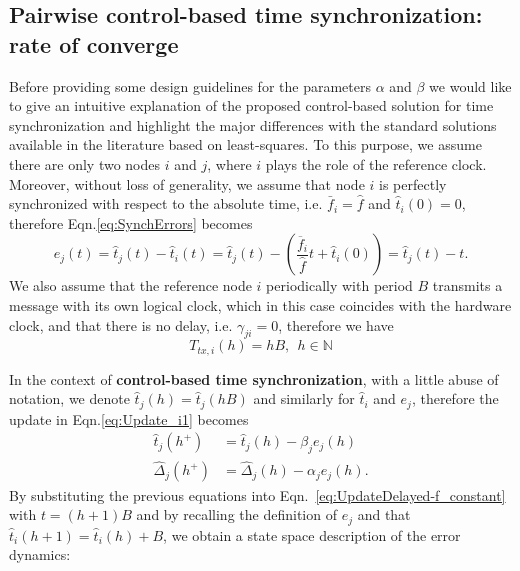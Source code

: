 \documentclass[english,a4paper,10pt,final]{article}
\numberwithin{equation}{section}
\numberwithin{figure}{section}
\begin{document}
\subsection{Pairwise control-based time synchronization: rate of converge}
\label{subsec:pairwise_control}

Before providing some design guidelines for the parameters $\alpha$ and $\beta$ we would like to give an intuitive explanation of the proposed control-based solution for time synchronization and highlight the major differences with the standard solutions available in the literature based on least-squares. To this purpose, we assume there are only two nodes $i$ and $j$, where $i$ plays the role of the reference clock. Moreover, without loss of generality, we assume that node $i$ is perfectly synchronized with respect to the absolute time, i.e. $\bar f_i=\hat f$ and $\hat t_i(0)=0$, therefore Eqn.\eqref{eq:SynchErrors} becomes
$$ e_j(t)=\hat{t}_j(t)-\hat{t}_i(t)=\hat{t}_j(t)-\left(\frac{\overline{f}_i}{\hat f}t+\hat{t}_i(0)\right)=\hat{t}_j(t)-t.$$
We also assume that the reference node $i$ periodically with period $B$ transmits a message with its own logical clock, which in this case coincides with the hardware clock, and that there is no delay, i.e. $\gamma_{ji}=0$, therefore we have
$$ T_{tx,i}(h)=hB, \ \ h\in \mathbb{N}$$


In the context of \textbf{control-based time synchronization}, with a little abuse of notation, we denote $\hat t_j(h)=\hat t_j(hB)$ and similarly for $\hat t_i$ and $e_j$, therefore the update in Eqn.\eqref{eq:Update_i1} becomes
\begin{align}
  \label{eq:up_simp}
\hat{t}_j(h^+) &=\hat{t}_j(h) - \beta_j e_j(h)\\
\hat{\Delta}_j(h^+)& = \hat{\Delta}_j(h)- \alpha_j e_j(h).\end{align}
By substituting the previous equations into Eqn.~\ref{eq:UpdateDelayed-f_constant} with $t=(h+1)B$ and by recalling the definition of $e_j$ and that $\hat t_i(h+1)=\hat t_i(h)+ B$, we obtain a state space description of the error dynamics:
\end{document}
